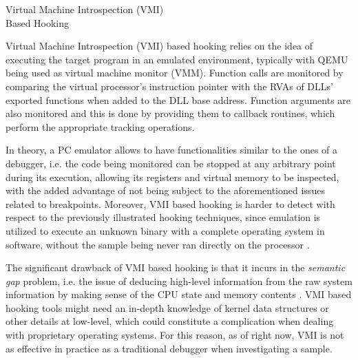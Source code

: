 \documentclass[binding=0.6cm,LaM,english,noexaminfo,oneside]{sapthesis} %
\begin{document}
\begin{section}{Virtual Machine Introspection (VMI) \\ 
Based Hooking}

Virtual Machine Introspection (VMI) based hooking relies on the idea of executing the target program in an emulated environment, typically with QEMU being used as virtual machine monitor (VMM). Function calls are monitored by comparing the virtual processor's instruction pointer with the RVAs of DLLs' exported functions when added to the DLL base address. Function arguments are also monitored and this is done by providing them to callback routines, which perform the appropriate tracking operations.

In theory, a PC emulator allows to have functionalities similar to the ones of a debugger, i.e. the code being monitored can be stopped at any arbitrary point during its execution, allowing its registers and virtual memory to be inspected, with the added advantage of not being subject to the aforementioned issues related to breakpoints.
Moreover, VMI based hooking is harder to detect with respect to the previously illustrated hooking techniques, since emulation is utilized to execute an unknown binary with a complete operating system in software, without the sample being never ran directly on the processor \cite{Bayer2005TTAnalyzeA}.

The significant drawback of VMI based hooking is that it incurs in the \textit{semantic gap} problem, i.e. the issue of deducing high-level information from the raw system information by making sense of the CPU state and memory contents \cite{Egele:2008:SAD:2089125.2089126}. VMI based hooking tools
might need an in-depth knowledge of kernel data structures or other details at low-level, which could constitute a complication when dealing with proprietary operating systems. For this reason, as of right now, VMI is not as effective in practice as a traditional debugger when investigating a sample.

\end{section}
\end{document}
